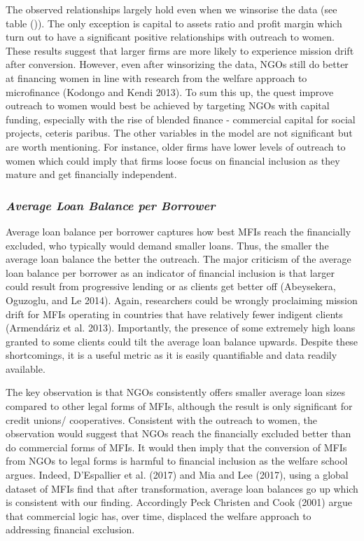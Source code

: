 \documentclass[
]{article}
\begin{document}
The observed relationships largely hold even when we winsorise the data
(see table ()). The only exception is capital to assets ratio and profit
margin which turn out to have a significant positive relationships with
outreach to women. These results suggest that larger firms are more
likely to experience mission drift after conversion. However, even after
winsorizing the data, NGOs still do better at financing women in line
with research from the welfare approach to microfinance (Kodongo and
Kendi 2013). To sum this up, the quest improve outreach to women would
best be achieved by targeting NGOs with capital funding, especially with
the rise of blended finance - commercial capital for social projects,
ceteris paribus. The other variables in the model are not significant
but are worth mentioning. For instance, older firms have lower levels of
outreach to women which could imply that firms loose focus on financial
inclusion as they mature and get financially independent.

\hypertarget{average-loan-balance-per-borrower}{%
\subsubsection{\texorpdfstring{\textbf{\emph{Average Loan Balance per
Borrower}}}{Average Loan Balance per Borrower}}\label{average-loan-balance-per-borrower}}

Average loan balance per borrower captures how best MFIs reach the
financially excluded, who typically would demand smaller loans. Thus,
the smaller the average loan balance the better the outreach. The major
criticism of the average loan balance per borrower as an indicator of
financial inclusion is that larger could result from progressive lending
or as clients get better off (Abeysekera, Oguzoglu, and Le 2014). Again,
researchers could be wrongly proclaiming mission drift for MFIs
operating in countries that have relatively fewer indigent clients
(Armendáriz et al. 2013). Importantly, the presence of some extremely
high loans granted to some clients could tilt the average loan balance
upwards. Despite these shortcomings, it is a useful metric as it is
easily quantifiable and data readily available.

The key observation is that NGOs consistently offers smaller average
loan sizes compared to other legal forms of MFIs, although the result is
only significant for credit unions/ cooperatives. Consistent with the
outreach to women, the observation would suggest that NGOs reach the
financially excluded better than do commercial forms of MFIs. It would
then imply that the conversion of MFIs from NGOs to legal forms is
harmful to financial inclusion as the welfare school argues. Indeed,
D'Espallier et al. (2017) and Mia and Lee (2017), using a global dataset
of MFIs find that after transformation, average loan balances go up
which is consistent with our finding. Accordingly Peck Christen and Cook
(2001) argue that commercial logic has, over time, displaced the welfare
approach to addressing financial exclusion.
\end{document}
